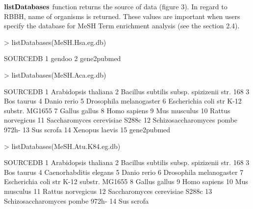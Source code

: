 \documentclass[11pt]{article}
\begin{document}
$\bf{listDatabases}$ function returns the source of data (figure 3). In regard to RBBH, name of organisms is returned. These values are important when users specify the database for MeSH Term enrichment analysis (see the section 2.4).

\begin{center}
\begin{Schunk}
\begin{Sinput}
> listDatabases(MeSH.Hsa.eg.db)
\end{Sinput}
\begin{Soutput}
     SOURCEDB
1      gendoo
2 gene2pubmed
\end{Soutput}
\begin{Sinput}
> listDatabases(MeSH.Aca.eg.db)
\end{Sinput}
\begin{Soutput}
                                       SOURCEDB
1                          Arabidopsis thaliana
2  Bacillus subtilis subsp. spizizenii str. 168
3                                    Bos taurus
4                                   Danio rerio
5                       Drosophila melanogaster
6      Escherichia coli str K-12 substr. MG1655
7                                 Gallus gallus
8                                  Homo sapiens
9                                  Mus musculus
10                            Rattus norvegicus
11               Saccharomyces cerevisiae S288c
12              Schizosaccharomyces pombe 972h-
13                                   Sus scrofa
14                               Xenopus laevis
15                                  gene2pubmed
\end{Soutput}
\begin{Sinput}
> listDatabases(MeSH.Atu.K84.eg.db)
\end{Sinput}
\begin{Soutput}
                                       SOURCEDB
1                          Arabidopsis thaliana
2  Bacillus subtilis subsp. spizizenii str. 168
3                                    Bos taurus
4                        Caenorhabditis elegans
5                                   Danio rerio
6                       Drosophila melanogaster
7      Escherichia coli str K-12 substr. MG1655
8                                 Gallus gallus
9                                  Homo sapiens
10                                 Mus musculus
11                            Rattus norvegicus
12               Saccharomyces cerevisiae S288c
13              Schizosaccharomyces pombe 972h-
14                                   Sus scrofa

\end{Soutput}
\end{Schunk}
\end{center}
\end{document}

